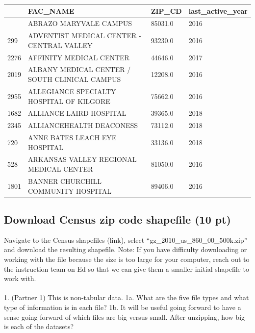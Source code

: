\documentclass[
  letterpaper,
  DIV=11,
  numbers=noendperiod]{scrartcl}
\makeatletter
\let\oldparagraph\paragraph
\renewcommand{\paragraph}{
    \@ifstar
      \xxxParagraphStar
      \xxxParagraphNoStar
  }
\newcommand{\xxxParagraphStar}[1]{\oldparagraph*{#1}\mbox{}}
\newcommand{\xxxParagraphNoStar}[1]{\oldparagraph{#1}\mbox{}}
\makeatother
\begin{document}
\begin{longtable}[]{@{}llll@{}}
\toprule\noalign{}
& FAC\_NAME & ZIP\_CD & last\_active\_year \\
\midrule\noalign{}
\endhead
\bottomrule\noalign{}
\endlastfoot
93 & ABRAZO MARYVALE CAMPUS & 85031.0 & 2016 \\
299 & ADVENTIST MEDICAL CENTER - CENTRAL VALLEY & 93230.0 & 2016 \\
2276 & AFFINITY MEDICAL CENTER & 44646.0 & 2017 \\
2019 & ALBANY MEDICAL CENTER / SOUTH CLINICAL CAMPUS & 12208.0 & 2016 \\
2955 & ALLEGIANCE SPECIALTY HOSPITAL OF KILGORE & 75662.0 & 2016 \\
1682 & ALLIANCE LAIRD HOSPITAL & 39365.0 & 2018 \\
2345 & ALLIANCEHEALTH DEACONESS & 73112.0 & 2018 \\
720 & ANNE BATES LEACH EYE HOSPITAL & 33136.0 & 2018 \\
528 & ARKANSAS VALLEY REGIONAL MEDICAL CENTER & 81050.0 & 2016 \\
1801 & BANNER CHURCHILL COMMUNITY HOSPITAL & 89406.0 & 2016 \\
\end{longtable}

\subsection{Download Census zip code shapefile (10
pt)}\label{download-census-zip-code-shapefile-10-pt}

Navigate to the Census shapefiles (link), select
``gz\_2010\_us\_860\_00\_500k.zip'' and download the resulting
shapefile. Note: If you have difficulty downloading or working with the
file because the size is too large for your computer, reach out to the
instruction team on Ed so that we can give them a smaller initial
shapefile to work with.

\paragraph{1. (Partner 1) This is non-tabular data. 1a. What are the
five file types and what type of information is in each file? 1b. It
will be useful going forward to have a sense going forward of which
files are big versus small. After unzipping, how big is each of the
datasets?}\label{partner-1-this-is-non-tabular-data.-1a.-what-are-the-five-file-types-and-what-type-of-information-is-in-each-file-1b.-it-will-be-useful-going-forward-to-have-a-sense-going-forward-of-which-files-are-big-versus-small.-after-unzipping-how-big-is-each-of-the-datasets}
\end{document}
